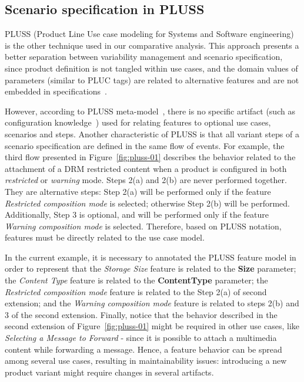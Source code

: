 \documentclass{acm_proc_article-sp}
\begin{document}
\subsection{Scenario specification in PLUSS}
\label{sub:pluss}

PLUSS (Product Line Use case modeling for Systems and Software engineering) is the other technique used in our comparative analysis. This approach presents a better separation 
between variability management and scenario specification, since product definition is not tangled within use cases, 
and the domain values of parameters (similar to PLUC tags) are related to alternative features and are 
not embedded in specifications~\cite{eriksson-splc-2005}. 

However, according to PLUSS meta-model~\cite{eriksson-splc-2005}, there is no specific artifact (such as configuration knowledge~\cite{czarnecki-book, phol-spl-book}) used for relating  features to optional use cases, scenarios and steps. Another characteristic of PLUSS is that all variant steps of a scenario specification are defined in the same flow of events. 
For example, the third flow presented in Figure~\ref{fig:pluss-01} describes the behavior related to the attachment of 
a DRM restricted content when a product is configured in both \emph{restricted} or \emph{warning} mode. Steps 2(a) and 2(b) are 
never performed together. They are alternative steps: Step 2(a) will be performed only if the feature \emph{Restricted composition 
mode} is selected; otherwise Step 2(b) will be performed. Additionally, Step 3 is optional, and will be performed only if the feature 
\emph{Warning composition mode} is selected. Therefore, based on PLUSS notation, features must be directly related to the use case 
model. 

In the current example, it is necessary to annotated the PLUSS feature model in order to represent that the 
\emph{Storage Size} feature is related to the {\bf Size} parameter; the \emph{Content Type} feature is related to the {\bf ContentType} parameter; the \emph{Restricted composition mode} feature is 
related to the Step 2(a) of second extension; and the \emph{Warning composition mode} feature is 
related to steps 2(b) and 3 of the second extension. Finally, notice that the behavior described in the second 
extension of Figure~\ref{fig:pluss-01} might be required in other use cases, like \emph{Selecting a Message to Forward} - 
since it is possible to attach a multimedia content while forwarding a message. Hence, a feature behavior can be spread 
among several use cases, resulting in maintainability issues: introducing a new product 
variant might require changes in several artifacts.
\end{document}
